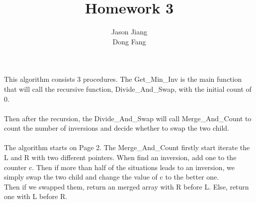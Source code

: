 \documentclass{article}
\author{Jason Jiang\\ Dong Fang}
\title{Homework 3}
\begin{document}
    \maketitle
    This algorithm consists 3 procedures. The Get\_Min\_Inv is the main function that will call the recursive function, Divide\_And\_Swap, with the initial count of 0. \\ \\
    
    Then after the recursion, the Divide\_And\_Swap will call Merge\_And\_Count to count the number of inversions and decide whether to swap the two child. \\
    \\ 
    
    The algorithm starts on Page 2.
    \clearpage
    The Merge\_And\_Count firstly start iterate the L and R with two different pointers. When find an inversion, add one to the counter c. Then if more than half of the situations leads to an inversion, we simply swap the two child and change the value of c to the better one. \\
    Then if we swapped them, return an merged array with R before L. Else, return one with L before R. 
    \\
    
    
   
\end{document}
